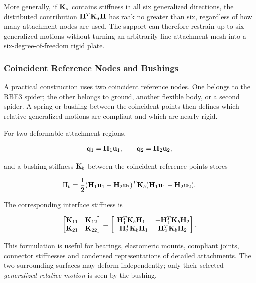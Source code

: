 More generally, if $\mathbf{K}_s$ contains stiffness in all six generalized
directions, the distributed contribution $\mathbf{H}^T\mathbf{K}_s\mathbf{H}$ has rank no
greater than six, regardless of how many attachment nodes are used. The support
can therefore restrain up to six generalized motions without turning an
arbitrarily fine attachment mesh into a six-degree-of-freedom rigid plate.

\subsubsection{Coincident Reference Nodes and Bushings}

A practical construction uses two coincident reference nodes. One belongs to the
RBE3 spider; the other belongs to ground, another flexible body, or a second
spider. A spring or bushing between the coincident points then defines which
relative generalized motions are compliant and which are nearly rigid.

For two deformable attachment regions,

\begin{equation}
    \mathbf{q}_1=\mathbf{H}_1\mathbf{u}_1,
    \qquad
    \mathbf{q}_2=\mathbf{H}_2\mathbf{u}_2,
\end{equation}

and a bushing stiffness $\mathbf{K}_b$ between the coincident reference points stores

\begin{equation}
    \Pi_b=\frac{1}{2}
    (\mathbf{H}_1\mathbf{u}_1-\mathbf{H}_2\mathbf{u}_2)^T
    \mathbf{K}_b
    (\mathbf{H}_1\mathbf{u}_1-\mathbf{H}_2\mathbf{u}_2).
\end{equation}

The corresponding interface stiffness is

\begin{equation}\label{rbe3-two-sided-bushing-stiffness}
\begin{bmatrix}
\mathbf{K}_{11}&\mathbf{K}_{12}\\
\mathbf{K}_{21}&\mathbf{K}_{22}
\end{bmatrix}
=
\begin{bmatrix}
\mathbf{H}_1^T\mathbf{K}_b\mathbf{H}_1 & -\mathbf{H}_1^T\mathbf{K}_b\mathbf{H}_2\\
-\mathbf{H}_2^T\mathbf{K}_b\mathbf{H}_1 & \mathbf{H}_2^T\mathbf{K}_b\mathbf{H}_2
\end{bmatrix}.
\end{equation}

This formulation is useful for bearings, elastomeric mounts, compliant joints,
connector stiffnesses and condensed representations of detailed attachments.
The two surrounding surfaces may deform independently; only their selected
\emph{generalized relative motion} is seen by the bushing.

